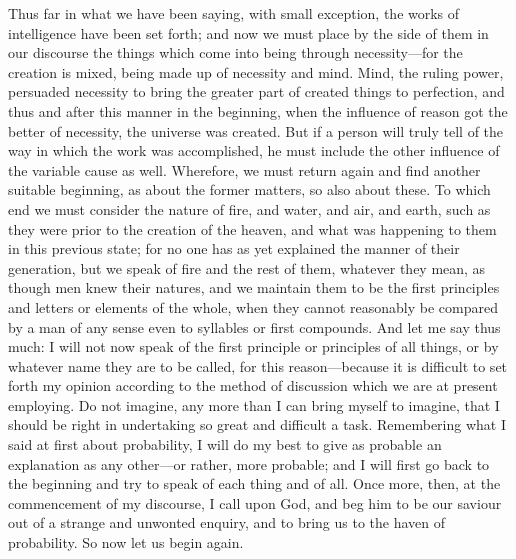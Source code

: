 Thus far in what we have been saying, with small exception, the works of
intelligence have been set forth; and now we must place by the side of
them in our discourse the things which come into being through necessity—for
the creation is mixed, being made up of necessity and mind. Mind, the
ruling power, persuaded necessity to bring the greater part of created
things to perfection, and thus and after this manner in the beginning,
when the influence of reason got the better of necessity, the universe was
created. But if a person will truly tell of the way in which the work was
accomplished, he must include the other influence of the variable cause as
well. Wherefore, we must return again and find another suitable beginning,
as about the former matters, so also about these. To which end we must
consider the nature of fire, and water, and air, and earth, such as they
were prior to the creation of the heaven, and what was happening to them
in this previous state; for no one has as yet explained the manner of
their generation, but we speak of fire and the rest of them, whatever they
mean, as though men knew their natures, and we maintain them to be the
first principles and letters or elements of the whole, when they cannot
reasonably be compared by a man of any sense even to syllables or first
compounds. And let me say thus much: I will not now speak of the first
principle or principles of all things, or by whatever name they are to be
called, for this reason—because it is difficult to set forth my
opinion according to the method of discussion which we are at present
employing. Do not imagine, any more than I can bring myself to imagine,
that I should be right in undertaking so great and difficult a task.
Remembering what I said at first about probability, I will do my best to
give as probable an explanation as any other—or rather, more
probable; and I will first go back to the beginning and try to speak of
each thing and of all. Once more, then, at the commencement of my
discourse, I call upon God, and beg him to be our saviour out of a strange
and unwonted enquiry, and to bring us to the haven of probability. So now
let us begin again.

